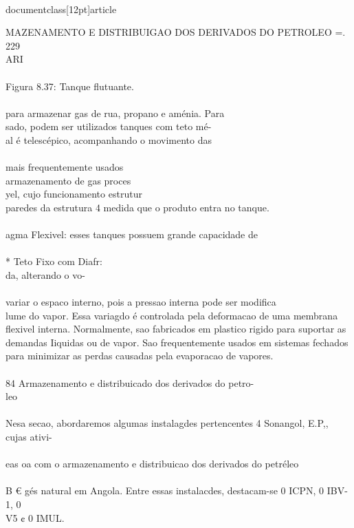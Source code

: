 \\documentclass[12pt]{article}
\begin{document}
MAZENAMENTO E DISTRIBUIGAO DOS DERIVADOS DO PETROLEO =. 229\\
ARI\\
\\
Figura 8.37: Tanque flutuante.\\
\\
para armazenar gas de rua, propano e aménia. Para\\
sado, podem ser utilizados tanques com teto mé-\\
al é telescépico, acompanhando o movimento das\\
\\
mais frequentemente usados\\
 armazenamento de gas proces\\
yel, cujo funcionamento estrutur\\
paredes da estrutura 4 medida que o produto entra no tanque.\\
\\
agma Flexivel: esses tanques possuem grande capacidade de\\
\\
* Teto Fixo com Diafr:\\
da, alterando o vo-\\
\\
variar o espaco interno, pois a pressao interna pode ser modifica\\
lume do vapor. Essa variagdo é controlada pela deformacao de uma membrana\\
flexivel interna. Normalmente, sao fabricados em plastico rigido para suportar as\\
demandas Iiquidas ou de vapor. Sao frequentemente usados em sistemas fechados\\
para minimizar as perdas causadas pela evaporacao de vapores.\\
\\
84 Armazenamento e distribuicado dos derivados do petro-\\
leo\\
\\
Nesa secao, abordaremos algumas instalagdes pertencentes 4 Sonangol, E.P,, cujas ativi-\\
\\
eas oa com o armazenamento e distribuicao dos derivados do petréleo\\
\\
B € gés natural em Angola. Entre essas instalacdes, destacam-se 0 ICPN, 0 IBV-1, 0\\
V5 ¢ 0 IMUL.\\
\end{document}
